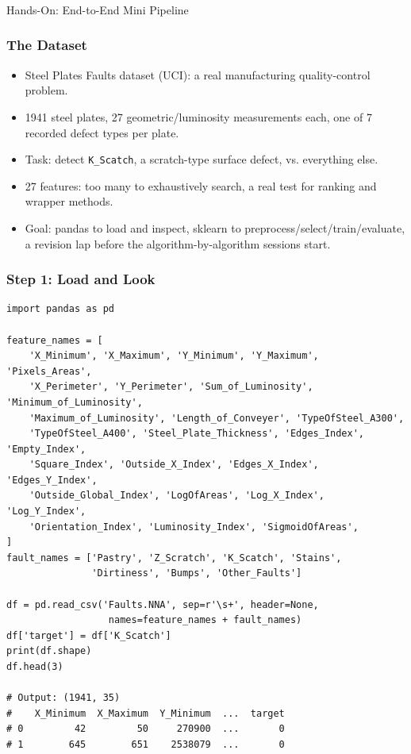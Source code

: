 \begin{frame}[fragile]\frametitle{}
\begin{center}
{\Large Hands-On: End-to-End Mini Pipeline}
\end{center}
\end{frame}

\begin{frame}[fragile]\frametitle{The Dataset}
\begin{itemize}
\item Steel Plates Faults dataset (UCI): a real manufacturing quality-control problem.
\item 1941 steel plates, 27 geometric/luminosity measurements each, one of 7 recorded defect types per plate.
\item Task: detect \texttt{K\_Scatch}, a scratch-type surface defect, vs. everything else.
\item 27 features: too many to exhaustively search, a real test for ranking and wrapper methods.
\item Goal: pandas to load and inspect, sklearn to preprocess/select/train/evaluate, a revision lap before the algorithm-by-algorithm sessions start.
\end{itemize}
\end{frame}

\begin{frame}[fragile]\frametitle{Step 1: Load and Look}
\begin{lstlisting}[basicstyle=\tiny\ttfamily]
import pandas as pd

feature_names = [
    'X_Minimum', 'X_Maximum', 'Y_Minimum', 'Y_Maximum', 'Pixels_Areas',
    'X_Perimeter', 'Y_Perimeter', 'Sum_of_Luminosity', 'Minimum_of_Luminosity',
    'Maximum_of_Luminosity', 'Length_of_Conveyer', 'TypeOfSteel_A300',
    'TypeOfSteel_A400', 'Steel_Plate_Thickness', 'Edges_Index', 'Empty_Index',
    'Square_Index', 'Outside_X_Index', 'Edges_X_Index', 'Edges_Y_Index',
    'Outside_Global_Index', 'LogOfAreas', 'Log_X_Index', 'Log_Y_Index',
    'Orientation_Index', 'Luminosity_Index', 'SigmoidOfAreas',
]
fault_names = ['Pastry', 'Z_Scratch', 'K_Scatch', 'Stains',
               'Dirtiness', 'Bumps', 'Other_Faults']

df = pd.read_csv('Faults.NNA', sep=r'\s+', header=None,
                  names=feature_names + fault_names)
df['target'] = df['K_Scatch']
print(df.shape)
df.head(3)

# Output: (1941, 35)
#    X_Minimum  X_Maximum  Y_Minimum  ...  target
# 0         42         50     270900  ...       0
# 1        645        651    2538079  ...       0
\end{lstlisting}
\end{frame}

